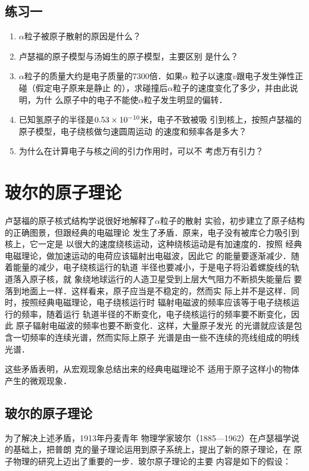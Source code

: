 \subsection*{练习一}
\begin{enumerate}
    \item $\alpha$粒子被原子散射的原因是什么？
    \item 卢瑟福的原子模型与汤姆生的原子模型，主要区别
    是什么？
    \item $\alpha$粒子的质量大约是电子质量的7300倍．如果$\alpha$
    粒子以速度$v$跟电子发生弹性正碰（假定电子原来是静止
    的），求碰撞后$\alpha$粒子的速度变化了多少，并由此说明，为什
    么原子中的电子不能使$\alpha$粒子发生明显的偏转．
    \item 已知氢原子的半径是$0.53\times10^{-10}$米，电子不致被吸
    引到核上，按照卢瑟福的原子模型，电子绕核做匀速圆周运动
    的速度和频率各是多大？
    \item 为什么在计算电子与核之间的引力作用时，可以不
    考虑万有引力？

\end{enumerate}

\section{玻尔的原子理论}
卢瑟福的原子核式结构学说很好地解释了$\alpha$粒子的散射
实验，初步建立了原子结构的正确图景，但跟经典的电磁理论
发生了矛盾．原来，电子没有被库仑力吸引到核上，它一定是
以很大的速度绕核运动，这种绕核运动是有加速度的．按照
经典电磁理论，做加速运动的电荷应该辐射出电磁波，因此它
的能量要逐渐减少．随着能量的减少，电子绕核运行的轨道
半径也要减小，于是电子将沿着螺旋线的轨道落入原子核，就
象绕地球运行的人造卫星受到上层大气阻力不断损失能量后
要落到地面上一样．这样看来，原子应当是不稳定的，然而实
际上并不是这样．同时，按照经典电磁理论，电子绕核运行时
辐射电磁波的频率应该等于电子绕核运行的频率，随着运行
轨道半径的不断变化，电子绕核运行的频率要不断变化，因此
原子辐射电磁波的频率也要不断变化．这样，大量原子发光
的光谱就应该是包含一切频率的连续光谱，然而实际上原子
光谱是由一些不连续的亮线组成的明线光谱．

这些矛盾表明，从宏观现象总结出来的经典电磁理论不
适用于原子这样小的物体产生的微观现象．

\subsection{玻尔的原子理论} 

为了解决上述矛盾，1913年丹麦青年
物理学家玻尔（1885—1962）在卢瑟福学说的基础上，把普朗
克的量子理论运用到原子系统上，提出了新的原子理论，在
原子物理的研究上迈出了重要的一步．玻尔原子理论的主要
内容是如下的假设：

